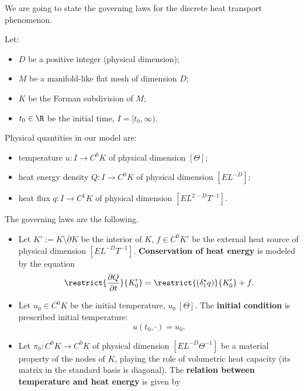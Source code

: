 \begin{discussion}
  We are going to state the governing laws for the discrete heat transport
  phenomenon.

  Let:
  \begin{itemize}
    \item $D$ be a positive integer (physical dimension);
    \item $M$ be a manifold-like flat mesh of dimension $D$;
    \item $K$ be the Forman subdivision of $M$;
    \item $t_0 \in \R$ be the initial time, $I = [t_0, \infty)$.
  \end{itemize}
  Physical quantities in our model are:
  \begin{itemize}
    \item
      temperature $u \colon I \to C^0 K$ of physical dimension $[\Theta]$;
    \item
      heat energy density $Q \colon I \to C^0 K$ of physical dimension
      $[E L^{-D}]$;
    \item
      heat flux $q \colon I \to C^1 K$ of physical dimension
      $[E L^{2 - D} T^{-1}]$.
  \end{itemize}
  The governing laws are the following.
  \begin{itemize}
    \item
      Let
        $K' := K \setminus \partial K$ be the interior of $K$,
        $f \in C^0 K'$ be the external heat source of physical dimension
          $[E L^{-D} T^{-1}]$.
      \textbf{Conservation of heat energy} is modeled by the equation
      \begin{equation}
        \restrict{\frac{\partial Q}{\partial t}}{K'_0} =
        \restrict{(\delta_1^\star q)}{K'_0} + f.
      \end{equation}
    \item
      Let
        $u_0 \in C^0 K$ be the initial temperature, $u_0\ [\Theta]$.
      The \textbf{initial condition} is prescribed initial temperature:
      \begin{equation}
        u(t_0, \cdot) = u_0.
      \end{equation}
    \item
      Let $\pi_0 \colon C^0 K \to C^0 K$
      of physical dimension $[E L^{-D} \Theta^{-1}]$
      be a material property of the nodes of $K$,
      playing the role of volumetric heat capacity
      (its matrix in the standard basis is diagonal).
      The \textbf{relation between temperature and heat energy} is given by

\end{itemize}
\end{discussion}
